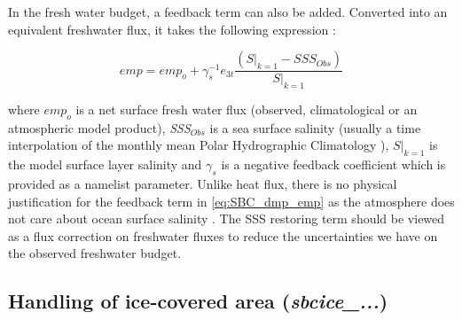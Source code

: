 \documentclass[../main/NEMO_manual]{subfiles}
\begin{document}
In the fresh water budget, a feedback term can also be added.
Converted into an equivalent freshwater flux, it takes the following expression :

\begin{equation}
  \label{eq:SBC_dmp_emp}
  \textit{emp} = \textit{emp}_o + \gamma_s^{-1} e_{3t}  \frac{  \left(\left.S\right|_{k=1}-SSS_{Obs}\right)}
  {\left.S\right|_{k=1}}
\end{equation}

where $\textit{emp}_{o }$ is a net surface fresh water flux
(observed, climatological or an atmospheric model product),
\textit{SSS}$_{Obs}$ is a sea surface salinity
(usually a time interpolation of the monthly mean Polar Hydrographic Climatology \citep{steele.morley.ea_JC01}),
$\left.S\right|_{k=1}$ is the model surface layer salinity and
$\gamma_s$ is a negative feedback coefficient which is provided as a namelist parameter.
Unlike heat flux, there is no physical justification for the feedback term in \autoref{eq:SBC_dmp_emp} as
the atmosphere does not care about ocean surface salinity \citep{madec.delecluse_IWN97}.
The SSS restoring term should be viewed as a flux correction on freshwater fluxes to
reduce the uncertainties we have on the observed freshwater budget.

\subsection{Handling of ice-covered area  (\textit{sbcice\_...})}
\label{subsec:SBC_ice-cover}
\end{document}
